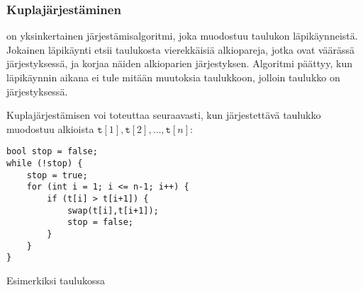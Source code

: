 \begin{center}
\end{center}

\subsubsection{Kuplajärjestäminen}


on yksinkertainen järjestämisalgoritmi,
joka muodostuu taulukon läpikäynneistä.
Jokainen läpikäynti etsii taulukosta
vierekkäisiä alkiopareja,
jotka ovat väärässä järjestyksessä,
ja korjaa näiden alkioparien järjestyksen.
Algoritmi päättyy, kun läpikäynnin
aikana ei tule mitään muutoksia taulukkoon,
jolloin taulukko on järjestyksessä.

Kuplajärjestämisen voi toteuttaa seuraavasti,
kun järjestettävä taulukko muodostuu alkioista
$\texttt{t}[1],\texttt{t}[2],\ldots,\texttt{t}[n]$:
\begin{lstlisting}
bool stop = false;
while (!stop) {
    stop = true;
    for (int i = 1; i <= n-1; i++) {
        if (t[i] > t[i+1]) {
            swap(t[i],t[i+1]);
            stop = false;
        }
    }
}
\end{lstlisting}

\noindent
Esimerkiksi taulukossa

\begin{center}
\end{center}

